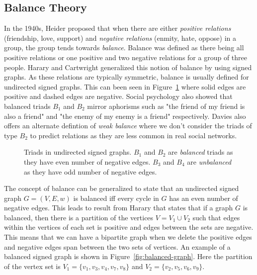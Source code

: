 \subsection{Balance Theory}
\label{sec:balance-theory}


In the 1940s, Heider \cite{heider1946attitudes} proposed  that when there are either \textit{positive relations} (friendship, love, support) and \textit{negative relations} (enmity, hate, oppose) in a group, the  group tends towards \textit{balance}. Balance was defined as there being all positive relations or one positive and two negative relations for a group of three people. Harary and Cartwright \cite{cartwright1956structural} generalized this notion of balance by using signed graphs. As these relations are typically symmetric, balance is usually defined for undirected signed graphs. This can been seen in Figure~\ref{fig:signed-triads} where solid edges are positive and dashed edges are negative. Social psychology also showed that balanced triads $B_1$ and $B_2$ mirror aphorisms such as "the friend of my friend is also a friend" and "the enemy of my enemy is a friend" respectively. Davies \cite{davis1963weakBalance} also offers an alternate defintion of \textit{weak balance} where we don't consider the triads of type $B_2$ to predict relations as they are less common in real social networks.

\begin{figure}[!ht]     
    \centering
      
    \caption{Triads in undirected signed graphs. $B_1$ and $B_2$ are \textit{balanced} triads as they have even number of negative edges. $B_3$ and $B_4$ are \textit{unbalanced} as they have odd number of negative edges.}
    \label{fig:signed-triads}
\end{figure}

The concept of balance can be generalized to state that an undirected signed graph $G=(V,E,w)$ is balanced iff every cycle in $G$ has an even number of negative edges. This leads to result from Harary \cite{harary1953on} that states that if a graph $G$ is balanced, then there is a partition of the vertices $V = V_1 \cup V_2$ such that edges within the vertices of each set is positive and edges between the sets are negative. This means that we can have a bipartite graph when we delete the positive edges and negative edges span between the two sets of vertices. An example of a balanced signed graph is shown in Figure~\ref{fig:balanced-graph}. Here the partition of the vertex set is $V_1 = \{v_1,v_3,v_4,v_7,v_8\}$ and $V_2 = \{v_2,v_5,v_6,v_9\}$.

